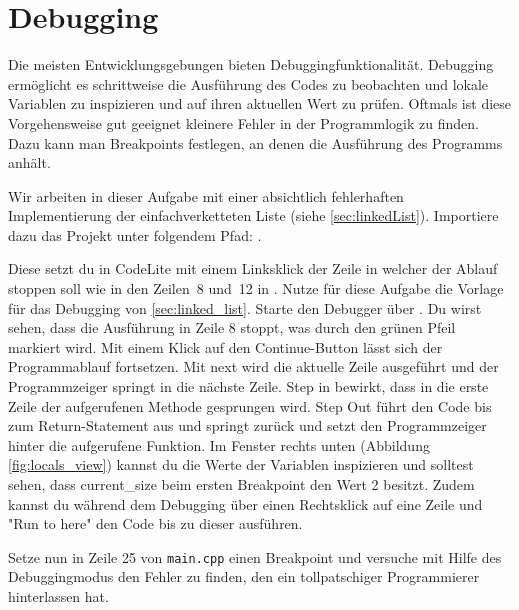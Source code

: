\section{\ExercisePrefixMemory Debugging \optional}\label{sec:debugging}
\optionaltextbox

Die meisten Entwicklungsgebungen bieten Debuggingfunktionalität.
Debugging ermöglicht es schrittweise die Ausführung des Codes zu beobachten und lokale Variablen zu inspizieren und auf ihren aktuellen Wert zu prüfen. Oftmals ist diese Vorgehensweise gut geeignet kleinere Fehler in der Programmlogik zu finden.
Dazu kann man Breakpoints festlegen, an denen die Ausführung des Programms anhält.

Wir arbeiten in dieser Aufgabe mit einer absichtlich fehlerhaften Implementierung der einfachverketteten Liste (siehe \ref{sec:linkedList}).
Importiere dazu das Projekt unter folgendem Pfad: .

Diese setzt du in CodeLite mit einem Linksklick der Zeile in welcher der Ablauf stoppen soll wie in den Zeilen~8 und~12 in . 
Nutze für diese Aufgabe die Vorlage für das Debugging von \ref{sec:linked_list}. Starte den Debugger über .
Du wirst sehen, dass die Ausführung in Zeile 8 stoppt, was durch den grünen Pfeil markiert wird. Mit einem Klick auf den Continue-Button lässt sich der Programmablauf fortsetzen. Mit next wird die aktuelle Zeile ausgeführt und der Programmzeiger springt in die nächste Zeile. Step in bewirkt, dass in die erste Zeile der aufgerufenen Methode gesprungen wird. Step Out führt den Code bis zum Return-Statement aus und springt zurück und setzt den Programmzeiger hinter die aufgerufene Funktion. Im Fenster rechts unten (Abbildung \ref{fig:locals_view}) kannst du die Werte der Variablen inspizieren und solltest sehen, dass current\_size beim ersten Breakpoint den Wert 2 besitzt. Zudem kannst du während dem Debugging über einen Rechtsklick auf eine Zeile und "Run to here"  den Code bis zu dieser ausführen.
 
 
Setze nun in Zeile 25 von \lstinline{main.cpp} einen Breakpoint und versuche mit Hilfe des Debuggingmodus den Fehler zu finden, den ein tollpatschiger Programmierer hinterlassen hat.

